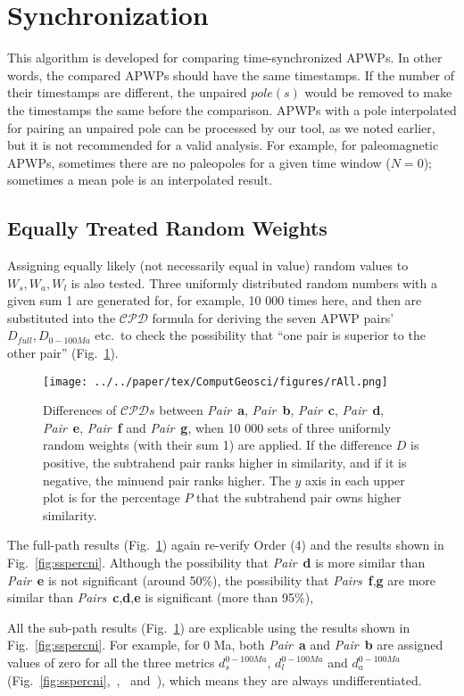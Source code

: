 \section{Synchronization}
This algorithm is developed for comparing time-synchronized APWPs. In other
words, the compared APWPs should have the same timestamps. If the number of
their timestamps are different, the unpaired $pole(s)$ would be removed to make
the timestamps the same before the comparison. APWPs with a pole interpolated
for pairing an unpaired pole can be processed by our tool, as we noted earlier,
but it is not recommended for a valid analysis. For example, for paleomagnetic
APWPs, sometimes there are no paleopoles for a given time window ($N=0$);
sometimes a mean pole is an interpolated result.

\subsection{Equally Treated Random Weights}
Assigning equally likely (not necessarily equal in value) random values to
$W_s,W_a,W_l$ is also tested. Three uniformly distributed random numbers with a
given sum 1 are generated for, for example, 10 000 times here, and then are
substituted into the $\mathcal{CPD}$ formula for deriving the seven APWP
pairs' $D_{full},D_{0-100Ma}$ etc.\ to check the possibility that ``one pair is
superior to the other pair'' (Fig.~\ref{fig:rall}).

\begin{figure}[!ht]
\centering
\texttt{[image: ../../paper/tex/ComputGeosci/figures/rAll.png]}
\caption[Comparisons of Pairs a-g with random weights involved]{Differences of
$\mathcal{CPD}s$ between \emph{Pair}~\textbf{a}, \emph{Pair}~\textbf{b},
\emph{Pair}~\textbf{c}, \emph{Pair}~\textbf{d}, \emph{Pair}~\textbf{e},
\emph{Pair}~\textbf{f} and \emph{Pair}~\textbf{g}, when 10 000 sets of three
uniformly random weights (with
their sum 1) are applied. If the difference $D$ is positive, the subtrahend pair
ranks higher in similarity, and if it is negative, the minuend pair ranks
higher. The $y$ axis in each upper plot is for the percentage $P$ that the
subtrahend pair owns higher similarity.}\label{fig:rall}
\end{figure}

The full-path results (Fig.~\ref{fig:rall}) again re-verify Order (4) and
the results shown in Fig.~\ref{fig:sspercni}. Although the possibility that
\emph{Pair}~\textbf{d} is more similar than \emph{Pair}~\textbf{e} is not
significant (around 50\%), the possibility that
\emph{Pairs}~\textbf{f},\textbf{g} are more similar than
\emph{Pairs}~\textbf{c},\textbf{d},\textbf{e} is significant (more than 95\%),

All the sub-path results (Fig.~\ref{fig:rall}) are explicable using the results
shown in Fig.~\ref{fig:sspercni}. For example, for 0 Ma, both
\emph{Pair}~\textbf{a} and \emph{Pair}~\textbf{b} are assigned values of zero
for all the three metrics $d_s^{0-100Ma}$, $d_l^{0-100Ma}$ and $d_a^{0-100Ma}$
(Fig.~\ref{fig:sspercni},~,~
and~), which means they are always undifferentiated.
